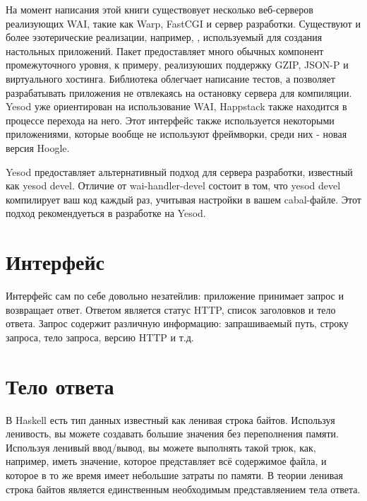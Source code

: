 На момент написания этой книги существовует несколько веб-серверов реализующих WAI, такие как Warp, FastCGI и
сервер разработки. Существуют и более эзотерические реализации, например,
,
используемый для создания настольных приложений. Пакет  предоставляет много обычных компонент промежуточного уровня, к примеру, реализуюших поддержку GZIP, JSON-P
и виртуального хостинга. Библиотека 
облегчает написание тестов, а  позволяет разрабатывать приложения не отвлекаясь на остановку сервера для компиляции.
Yesod уже ориентирован на использование WAI, Happstack также находится в процессе перехода на него.
Этот интерфейс также используется некоторыми приложениями, которые вообще не используют фреймворки, среди
них - новая версия Hoogle.

\begin{remark}
Yesod предоставляет альтернативный подход для сервера разработки, известный как
yesod devel. Отличие от wai-handler-devel состоит в том, что yesod devel компилирует
ваш код каждый раз, учитывая настройки в вашем cabal-файле.
Этот подход рекомендуеться в разработке на Yesod.
\end{remark}

\section {Интерфейс}

Интерфейс сам по себе довольно незатейлив: приложение принимает запрос и возвращает
ответ. Ответом является статус HTTP, список заголовков и тело ответа.
Запрос содержит различную информацию: запрашиваемый путь, строку запроса, тело запроса, версию HTTP и т.д.

\section {Тело ответа}

В Haskell есть тип данных известный как ленивая строка байтов. Используя ленивость,
вы можете создавать большие значения без переполнения памяти. Используя ленивый ввод/вывод,
вы можете выполнять такой трюк, как, например, иметь значение, которое представляет всё 
содержимое файла, и которое в то же время имеет небольшие затраты по памяти. В теории
ленивая строка байтов является единственным необходимым представляением тела ответа.

